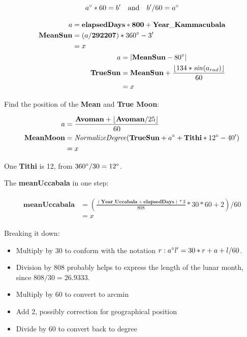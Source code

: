 \documentclass[11pt,oneside]{memoir-article}
\begin{document}
\[ a^\circ*60=b^\prime \quad \text{and} \quad b^\prime/60 = a^\circ \]

\begin{align}
\begin{split}
                      a &= \mathbf{elapsedDays} * \mathbf{800} + \mathbf{Year\_Kammacubala}\\
       \mathbf{MeanSun} &= (a / \mathbf{292207}) * 360^\circ - 3^\prime\\
                        &= x
\end{split}\\
\begin{split}
                         a &= | \mathbf{MeanSun} - 80^\circ | \\
          \mathbf{TrueSun} &= \mathbf{MeanSun} + \frac{\lfloor 134 * \mathit{sin}(a_{rad}) \rfloor}{60}\\
                           &= x
\end{split}
\end{align}

Find the position of the \textbf{Mean} and \textbf{True Moon}:

\begin{align}
\begin{split}
                  a &= \frac{\mathbf{Avoman} + \lfloor \mathbf{Avoman} / 25 \rfloor}{60}\\
  \mathbf{MeanMoon} &= \mathit{NormalizeDegree}( \mathbf{TrueSun} + a^\circ + \mathbf{Tithi} * 12^\circ - 40^\prime )\\
                    &= x
\end{split}
\end{align}

One \textbf{Tithi} is 12\degree, from $360^\circ / 30 = 12^\circ$.

The \textbf{meanUccabala} in one step:

\begin{align}
\begin{split}
  \mathbf{meanUccabala} &= \left( \frac{(\mathbf{Year\_Uccabala} + \mathbf{elapsedDays}) * 3}{808} * 30 * 60 + 2 \right) / 60\\
                        &= x
\end{split}
\end{align}

Breaking it down:

\begin{itemize}
\item Multiply by 30 to conform with the notation $r:a^\circ l^\prime = 30*r + a + l/60$.
\item Division by 808 probably helps to express the length of the lunar month, since $808 / 30 = 26.9333$.
\item Multiply by 60 to convert to arcmin
\item Add 2, possibly correction for geographical position
\item Divide by 60 to convert back to degree
\end{itemize}
\end{document}
